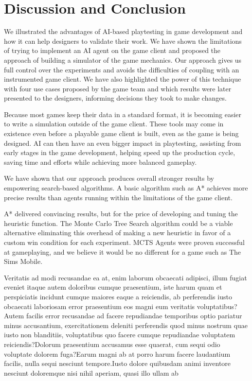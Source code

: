 \documentclass[letterpaper]{article} %
\begin{document}
\vspace{-1.66mm}
\section{Discussion and Conclusion}

We illustrated the advantages of AI-based playtesting in game development and how it can help designers to validate their work. We have shown the limitations of trying to implement an AI agent on the game client and proposed the approach of building a simulator of the game mechanics. Our approach gives us full control over the experiments and avoids the difficulties of coupling with an instrumented game client. We have also highlighted the power of this technique with four use cases proposed by the game team and which results were later presented to the designers, informing decisions they took to make changes.

Because most games keep their data in a standard format, it is becoming easier to write a simulation outside of the game client. These tools may come in existence even before a playable game client is built, even as the game is being designed. AI can then have an even bigger impact in playtesting, assisting from early stages in the game development, helping speed up the production cycle, saving time and efforts while achieving more balanced gameplay.

We have shown that our approach produces overall stronger results by empowering search-based algorithms. A basic algorithm such as A* achieves more precise results than agents running within the limitations of the game client.

A* delivered convincing results, but for the price of developing and tuning the heuristic function. The Monte Carlo Tree Search algorithm could be a viable alternative eliminating this overhead of making a new heuristic in favor of a custom win condition for each experiment. MCTS Agents were proven successful at gameplaying, and we believe it would be no different for a game such as The Sims Mobile.

Veritatis ad modi recusandae ea at, enim laborum obcaecati adipisci, illum fugiat eveniet itaque autem doloribus cumque praesentium, iste harum quam et perspiciatis incidunt cumque maiores eaque a reiciendis, ab perferendis iusto obcaecati laboriosam error praesentium eos magni eum veritatis voluptatibus?Autem facilis error recusandae ad facere repudiandae temporibus optio pariatur minus accusantium, exercitationem deleniti perferendis quod minus nostrum quae iusto non blanditiis, voluptatibus quo facere cumque repudiandae voluptatem reiciendis?Dolorum praesentium accusamus esse quaerat, cum sequi odio voluptate dolorem fuga?Earum magni ab at porro harum facere laudantium facilis, nulla sequi nesciunt tempore.Iusto dolore quibusdam animi inventore nesciunt doloremque nisi nihil aperiam, quasi illo ullam ab


\end{document}
